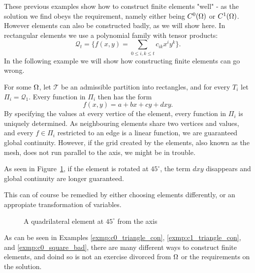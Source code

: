 These previous examples show how to construct finite elements "well" - as 
the solution we find obeys the requirement, namely either being $C^0(\Omega)$ or 
$C^1(\Omega)$. However elements can also be constructed badly, as we will 
show here. In rectangular elements we use a polynomial family with 
tensor products:
\begin{equation*}
    \mathcal{Q}_t = \{ f(x,y)= \sum_{0\leq i,k \leq t} c_{ik}x^iy^k \}.
\end{equation*}
In the following example we will show how constructing finite elements 
can go wrong.
\begin{exmp}{\quad\label{exmp:c0_square_bad}}
   For some $\Omega$, let $\mathcal{T}$ be an admissible partition into 
   rectangles, and for every $T_i$ let $\Pi_i = \mathcal{Q}_1$. 
   Every function in $\Pi_i$ then has the form 
   \begin{equation*}
    f(x,y) = a + bx + cy + dxy.
   \end{equation*}
   By specifying the values at every vertice of the element, every 
   function in $\Pi_i$ is uniquely determined. 
   As neighbouring elements share two vertices and values, and every $f\in\Pi_i$
   restricted to an edge is a linear function, we are guaranteed global 
   continuity. However, if the grid created by the elements, also known as 
   the mesh, does not run parallel to the axis, we might be in trouble.

   As seen in Figure~\ref{fig:quad_element_bad}, if the element is rotated 
   at $45^\circ$, the term $dxy$ disappears and global continuity are longer 
   guaranteed.

   This can of course be remedied by either choosing elements differently, 
   or an appropiate transformation of variables.
\end{exmp}
\begin{figure}[h]
    \centering
    
    \caption{A quadrilateral element at $45^\circ$ from the axis}
    \label{fig:quad_element_bad}
\end{figure}
As can be seen in Examples \ref{exmp:c0_triangle_con}, \ref{exmp:c1_triangle_con}, 
and \ref{exmp:c0_square_bad}, there are many different ways to construct 
finite elements, and doind so is not an exercise divorced from $\Omega$ or 
the requirements on the solution.